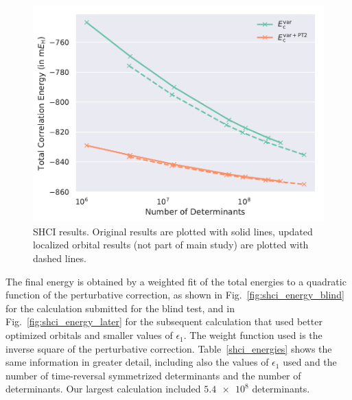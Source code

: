 \documentclass[journal=jcp,manuscript=suppinfo]{achemso}
\begin{document}
%
\begin{figure}[ht!]
\begin{center}
\includegraphics[scale=0.75]{figures/shci/shci.pdf}
\caption{SHCI results. Original results are plotted with solid lines, updated localized orbital results (not part of main study) are plotted with dashed lines.}
\label{shci_SI_fig}
\end{center}
\vspace{-0.6cm}
\end{figure}
%
The final energy is obtained by a weighted fit of the total energies to a quadratic function of the perturbative correction, as shown in Fig.~\ref{fig:shci_energy_blind} for the calculation submitted for the blind test, and in Fig.~\ref{fig:shci_energy_later} for the subsequent calculation that used better optimized orbitals and smaller values of $\epsilon_1$. The weight function used is the inverse square of the perturbative correction. Table~\ref{shci_energies} shows the same information in greater detail, including also the values of $\epsilon_1$ used
and the number of time-reversal symmetrized determinants and the number of determinants. Our largest calculation included $\num{5.4e8}$ determinants.\\
\end{document}
